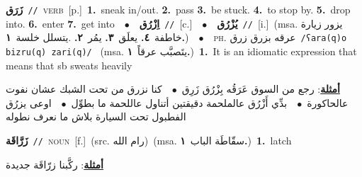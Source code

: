 \documentclass[10pt,a4paper,twoside]{article} %
\begin{document}
\begin{multicols}{2}
{\setlength\topsep{0pt}\textbf{\foreignlanguage{arabic}{زَرَق}}\ {\color{gray}\texttt{//}\color{black}}\ \textsc{verb}\ [p.]\ \textbf{1.}~sneak in/out.  \textbf{2.}~pass  \textbf{3.}~be stuck.  \textbf{4.}~to stop by.  \textbf{5.}~drop into.  \textbf{6.}~enter  \textbf{7.}~get into\ \ $\bullet$\ \ \setlength\topsep{0pt}\textbf{\foreignlanguage{arabic}{اِزْرُق}}\ {\color{gray}\texttt{//}\color{black}}\ [c.]\ \ $\bullet$\ \ \setlength\topsep{0pt}\textbf{\foreignlanguage{arabic}{يُزْرُق}}\ {\color{gray}\texttt{//}\color{black}}\ [i.]\ \color{gray}(msa. \foreignlanguage{arabic}{يزور زيارة خاطفة}~\foreignlanguage{arabic}{\textbf{٤.}}  \foreignlanguage{arabic}{يعلَق}~\foreignlanguage{arabic}{\textbf{٣.}}  \foreignlanguage{arabic}{يمُر}~\foreignlanguage{arabic}{\textbf{٢.}}  .\foreignlanguage{arabic}{يتسلل خلسة}~\foreignlanguage{arabic}{\textbf{١.}})\color{black}\ \ $\bullet$\ \ \textsc{ph.} \color{gray} \foreignlanguage{arabic}{عرقه بزرق زرق}\color{black}\ {\color{gray}\texttt{/{\sffamily ʕara(q)o bizru(q) zari(q)}/}\color{black}}\ \color{gray} (msa. \foreignlanguage{arabic}{يتَصبَّب عرقاً}~\foreignlanguage{arabic}{\textbf{١.}})\color{black}\ \textbf{1.}~It is an idiomatic expression that means that sb sweats heavily\  \begin{flushright}\color{gray}\foreignlanguage{arabic}{\textbf{\underline{\foreignlanguage{arabic}{أمثلة}}}: رجع من السوق عَرَقُه بِزْرُق زَرِق\ $\bullet$\ \  كنا نزرق من تحت الشبك عشان نفوت عالحاكورة\ $\bullet$\ \  بدِّي أَزْرُق عالملحمة دقيقتين أتناول عاللحمة ما بطوِّل\ $\bullet$\ \  اوعى يزرُق الفطبول تحت السيارة بلاش ما نعرف نطوله}\end{flushright}\color{black}} \vspace{2mm}

{\setlength\topsep{0pt}\textbf{\foreignlanguage{arabic}{زَرَّاقَة}}\ {\color{gray}\texttt{//}\color{black}}\ \textsc{noun}\ [f.]\ (src. \color{gray}\foreignlanguage{arabic}{رام الله}\color{black})\ \color{gray}(msa. \foreignlanguage{arabic}{سقّاطَة الباب}~\foreignlanguage{arabic}{\textbf{١.}})\color{black}\ \textbf{1.}~latch\  \begin{flushright}\color{gray}\foreignlanguage{arabic}{\textbf{\underline{\foreignlanguage{arabic}{أمثلة}}}: ركَّبنا زرّاقَة جديدة}\end{flushright}\color{black}} \vspace{2mm}


\end{multicols}
\end{document}
